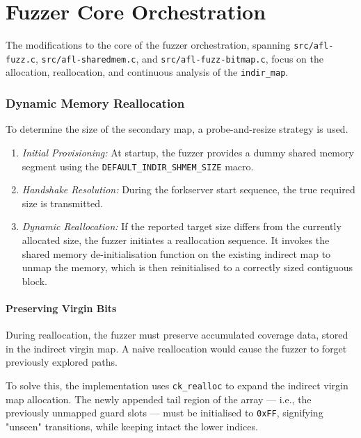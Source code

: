 \section{Fuzzer Core Orchestration}

The modifications to the core of the fuzzer orchestration, spanning \texttt{src/afl-fuzz.c}, \texttt{src/afl-sharedmem.c}, and \texttt{src/afl-fuzz-bitmap.c}, focus on the allocation, reallocation, and continuous analysis of the \texttt{indir\_map}.

\subsubsection{Dynamic Memory Reallocation}

To determine the size of the secondary map, a probe-and-resize strategy is used.

\begin{enumerate}
    \item \textit{Initial Provisioning:} At startup, the fuzzer provides a dummy shared memory segment using the \texttt{DEFAULT\_INDIR\_SHMEM\_SIZE} macro.
    
    \item \textit{Handshake Resolution:} During the forkserver start sequence, the true required size is transmitted.
    
    \item \textit{Dynamic Reallocation:} If the reported target size differs from the currently allocated size, the fuzzer initiates a reallocation sequence. It invokes the shared memory de-initialisation function on the existing indirect map to unmap the memory, which is then reinitialised to a correctly sized contiguous block.
\end{enumerate}

\paragraph{Preserving Virgin Bits} During reallocation, the fuzzer must preserve accumulated coverage data, stored in the indirect virgin map. A naive reallocation would cause the fuzzer to forget previously explored paths.

To solve this, the implementation uses \texttt{ck\_realloc} to expand the indirect virgin map allocation. The newly appended tail region of the array --- i.e., the previously unmapped guard slots --- must be initialised to \texttt{0xFF}, signifying "unseen" transitions, while keeping intact the lower indices.

